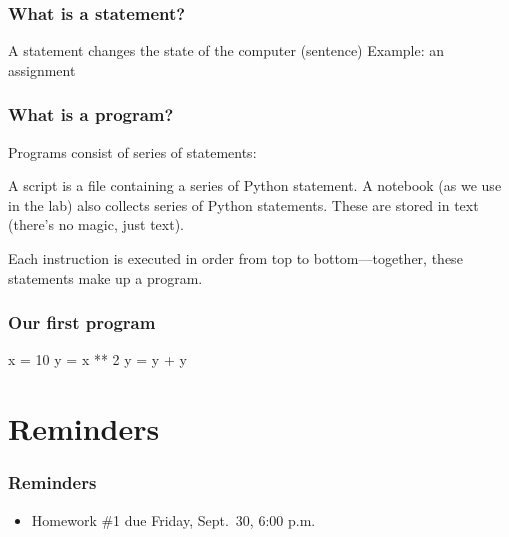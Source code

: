 \documentclass[11pt]{beamer}
\begin{document}
\begin{frame}
  \frametitle{What is a \textbf{statement}?}
  \Enlarge

  \begin{itemize}
  \myitem  A statement changes the state of the computer (sentence) \pause
  \myitem  Example:  an assignment
  \end{itemize}
\end{frame}

\begin{frame}
  \frametitle{What is a \textbf{program}?}
  \Enlarge

  \begin{itemize}
  \myitem  Programs consist of series of statements: \pause
    \begin{itemize}
    \mysubitem  A script is a file containing a series of Python statement. \pause
    \mysubitem  A notebook (as we use in the lab) also collects series of Python statements. \pause
    \mysubitem  These are stored in text (there’s no magic, just text). \pause
  \end{itemize}
  \myitem  Each instruction is executed in order from top to bottom—together, these statements make up a program.
  \end{itemize}
 \end{frame}

\begin{frame}[fragile]
  \frametitle{Our first program}
  \Enlarge

  \begin{semiverbatim}
x = 10
y = x ** 2
y = y + y
  \end{semiverbatim}
\end{frame}

\section{Reminders}

\begin{frame}
  \frametitle{Reminders}
  \Enlarge

  \begin{itemize}
  \item Homework \#1 due Friday, Sept.\ 30, 6:00 p.m.
  \end{itemize}
\end{frame}
\end{document}
